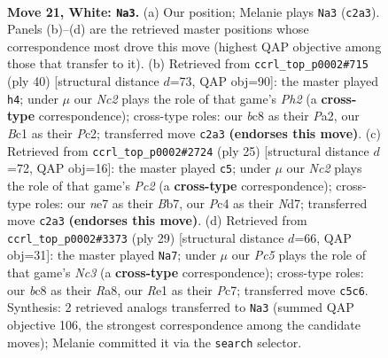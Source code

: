 \documentclass[11pt]{article}
\begin{document}
\clearpage

\begin{figure}[p]\centering
\begin{subfigure}{0.46\textwidth}\centering
\resizebox{\linewidth}{!}{%
\newchessgame
\chessboard[
  setfen={1rb2rk1/p3np2/1p2pnpp/2P5/2P5/4PB1P/P1N2PP1/1RB1R1K1 w - - 0 21},
  showmover=false,
  pgfstyle=straightmove, color=movearrow, markmove={c2-a3}
]}
\caption{}
\end{subfigure}\hfill
\begin{subfigure}{0.46\textwidth}\centering
\resizebox{\linewidth}{!}{%
\newchessgame
\chessboard[
  setfen={r1br2k1/5pp1/2p1pn1p/p2p4/N3P1P1/5P2/PPPRB2P/2K2R2 w - - 0 21},
  showmover=false,
  pgfstyle=straightmove, color=movearrow, markmove={h2-h4}
]}
\caption{}
\end{subfigure}
\\[4pt]
\begin{subfigure}{0.46\textwidth}\centering
\resizebox{\linewidth}{!}{%
\newchessgame
\chessboard[
  setfen={r2k3r/1bpn1ppp/pp3b2/3p4/3P4/P1N1PN2/1P3PPP/R3KB1R b KQ - 1 13},
  showmover=false,
  pgfstyle=straightmove, color=movearrow, markmove={c7-c5}
]}
\caption{}
\end{subfigure}\hfill
\begin{subfigure}{0.46\textwidth}\centering
\resizebox{\linewidth}{!}{%
\newchessgame
\chessboard[
  setfen={r1br4/1pp1ppkp/2n3p1/pB1P4/4P3/2N5/PP3PPP/3RK2R b K - 0 15},
  showmover=false,
  pgfstyle=straightmove, color=movearrow, markmove={c6-a7}
]}
\caption{}
\end{subfigure}
\caption{\textbf{Move 21, White: \texttt{Na3}.} (a) Our position; Melanie plays \texttt{Na3} (\texttt{c2a3}). Panels (b)--(d) are the retrieved master positions whose correspondence most drove this move (highest QAP objective among those that transfer to it). (b) Retrieved from \texttt{ccrl\_top\_p0002\#715} (ply 40) [structural distance $d$=73, QAP obj=90]: the master played \texttt{h4}; under $\mu$ our \emph{Nc2} plays the role of that game's \emph{Ph2} (a \textbf{cross-type} correspondence); cross-type roles: our \emph{b}c8 as their \emph{P}a2, our \emph{B}c1 as their \emph{P}c2; transferred move \texttt{c2a3} \textbf{(endorses this move)}. (c) Retrieved from \texttt{ccrl\_top\_p0002\#2724} (ply 25) [structural distance $d$=72, QAP obj=16]: the master played \texttt{c5}; under $\mu$ our \emph{Nc2} plays the role of that game's \emph{Pc2} (a \textbf{cross-type} correspondence); cross-type roles: our \emph{n}e7 as their \emph{B}b7, our \emph{P}c4 as their \emph{N}d7; transferred move \texttt{c2a3} \textbf{(endorses this move)}. (d) Retrieved from \texttt{ccrl\_top\_p0002\#3373} (ply 29) [structural distance $d$=66, QAP obj=31]: the master played \texttt{Na7}; under $\mu$ our \emph{Pc5} plays the role of that game's \emph{Nc3} (a \textbf{cross-type} correspondence); cross-type roles: our \emph{b}c8 as their \emph{R}a8, our \emph{R}e1 as their \emph{P}c7; transferred move \texttt{c5c6}. Synthesis: 2 retrieved analogs transferred to \texttt{Na3} (summed QAP objective 106, the strongest correspondence among the candidate moves); Melanie committed it via the \texttt{search} selector.}
\label{fig:thought-m40}
\end{figure}
\end{document}
